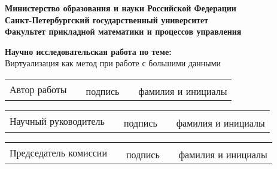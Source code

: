\begin{titlepage}
    \newpage
    \begin{center}
    {\bfseries Министерство образования и науки Российской Федерации \\
    Санкт-Петербургский государственный университет\\
    Факультет прикладной математики и процессов управления}

    \vspace{4em}
    \end{center}
    \vspace{1.2em}

    \begin{center}
    \textbf{\Large Научно исследовательская работа по теме:}\\
    \Large{Виртуализация как метод при работе с большими данными}
    \end{center}
    \vspace{5em}

    \begin{tabular}{lcccc}
        \multirow{2}{2cm}{Автор работы} & \hspace{3cm} & \underline{\hspace{3cm}} & \hspace{1cm} & \underline{\hspace{5cm}}\\
        \hspace{1cm} && \small{подпись} && \small{фамилия и инициалы} \\
    \end{tabular}

    \vspace{0.5cm}
    \begin{tabular}{lcccc}
        \multirow{2}{2cm}{Научный руководитель} & \hspace{3cm} & \underline{\hspace{3cm}} & \hspace{1cm} & \underline{\hspace{5cm}}\\
        \hspace{1cm} && \small{подпись} && \small{фамилия и инициалы} \\
    \end{tabular}

    \vspace{0.5cm}
    \begin{tabular}{lcccc}
        \multirow{2}{2cm}{Председатель комиссии} & \hspace{3cm} & \underline{\hspace{3cm}} & \hspace{1cm} & \underline{\hspace{5cm}}\\
        \hspace{1cm} && \small{подпись} && \small{фамилия и инициалы} \\
    \end{tabular}


\end{titlepage}
